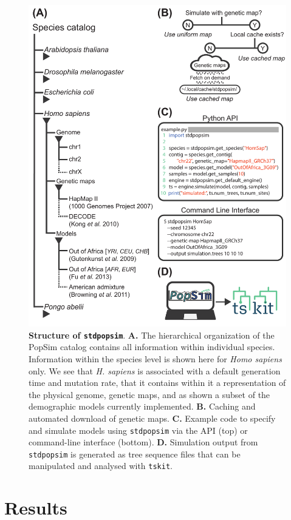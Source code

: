 \documentclass[12pt,halfline,a4paper]{ouparticle}
\newcommand{\stdpopsim}{\texttt{stdpopsim}\xspace}
\begin{document}
\begin{figure}[t]
\begin{center}
\includegraphics[width=0.5\linewidth]{display_items/Figure1.pdf}
\caption{\textbf{Structure of \stdpopsim}. \textbf{A.} The
hierarchical organization of the PopSim catalog contains all information
within individual species. Information within the species level is shown here
for \emph{Homo sapiens} only. We see that \emph{H. sapiens} is associated
with a default generation time and mutation rate, that it contains within
it a representation of the physical genome, genetic maps, and as shown a
subset of the demographic models currently implemented. \textbf{B.} Caching
and automated download of genetic maps. \textbf{C.} Example code to specify
and simulate models using \stdpopsim via the API (top) or
command-line interface (bottom). \textbf{D.} Simulation output from
\stdpopsim is generated as tree sequence files that can
be manipulated and analysed with \texttt{tskit}.}
\label{fig:cartoon}
\end{center}
\end{figure}

\section*{Results}
\end{document}
